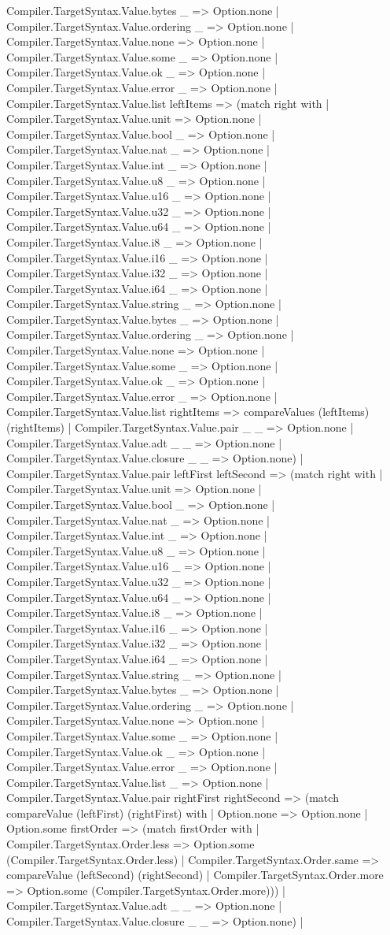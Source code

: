 \documentclass[11pt]{article}
\begin{document}
Compiler.TargetSyntax.Value.bytes \_ => Option.none | Compiler.TargetSyntax.Value.ordering \_ => Option.none | Compiler.TargetSyntax.Value.none => Option.none | Compiler.TargetSyntax.Value.some \_ => Option.none | Compiler.TargetSyntax.Value.ok \_ => Option.none | Compiler.TargetSyntax.Value.error \_ => Option.none | Compiler.TargetSyntax.Value.list leftItems => (match right with | Compiler.TargetSyntax.Value.unit => Option.none | Compiler.TargetSyntax.Value.bool \_ => Option.none | Compiler.TargetSyntax.Value.nat \_ => Option.none | Compiler.TargetSyntax.Value.int \_ => Option.none | Compiler.TargetSyntax.Value.u8 \_ => Option.none | Compiler.TargetSyntax.Value.u16 \_ => Option.none | Compiler.TargetSyntax.Value.u32 \_ => Option.none | Compiler.TargetSyntax.Value.u64 \_ => Option.none | Compiler.TargetSyntax.Value.i8 \_ => Option.none | Compiler.TargetSyntax.Value.i16 \_ => Option.none | Compiler.TargetSyntax.Value.i32 \_ => Option.none | Compiler.TargetSyntax.Value.i64 \_ => Option.none | Compiler.TargetSyntax.Value.string \_ => Option.none | Compiler.TargetSyntax.Value.bytes \_ => Option.none | Compiler.TargetSyntax.Value.ordering \_ => Option.none | Compiler.TargetSyntax.Value.none => Option.none | Compiler.TargetSyntax.Value.some \_ => Option.none | Compiler.TargetSyntax.Value.ok \_ => Option.none | Compiler.TargetSyntax.Value.error \_ => Option.none | Compiler.TargetSyntax.Value.list rightItems => compareValues (leftItems) (rightItems) | Compiler.TargetSyntax.Value.pair \_ \_ => Option.none | Compiler.TargetSyntax.Value.adt \_ \_ => Option.none | Compiler.TargetSyntax.Value.closure \_ \_ => Option.none) | Compiler.TargetSyntax.Value.pair leftFirst leftSecond => (match right with | Compiler.TargetSyntax.Value.unit => Option.none | Compiler.TargetSyntax.Value.bool \_ => Option.none | Compiler.TargetSyntax.Value.nat \_ => Option.none | Compiler.TargetSyntax.Value.int \_ => Option.none | Compiler.TargetSyntax.Value.u8 \_ => Option.none | Compiler.TargetSyntax.Value.u16 \_ => Option.none | Compiler.TargetSyntax.Value.u32 \_ => Option.none | Compiler.TargetSyntax.Value.u64 \_ => Option.none | Compiler.TargetSyntax.Value.i8 \_ => Option.none | Compiler.TargetSyntax.Value.i16 \_ => Option.none | Compiler.TargetSyntax.Value.i32 \_ => Option.none | Compiler.TargetSyntax.Value.i64 \_ => Option.none | Compiler.TargetSyntax.Value.string \_ => Option.none | Compiler.TargetSyntax.Value.bytes \_ => Option.none | Compiler.TargetSyntax.Value.ordering \_ => Option.none | Compiler.TargetSyntax.Value.none => Option.none | Compiler.TargetSyntax.Value.some \_ => Option.none | Compiler.TargetSyntax.Value.ok \_ => Option.none | Compiler.TargetSyntax.Value.error \_ => Option.none | Compiler.TargetSyntax.Value.list \_ => Option.none | Compiler.TargetSyntax.Value.pair rightFirst rightSecond => (match compareValue (leftFirst) (rightFirst) with | Option.none => Option.none | Option.some firstOrder => (match firstOrder with | Compiler.TargetSyntax.Order.less => Option.some (Compiler.TargetSyntax.Order.less) | Compiler.TargetSyntax.Order.same => compareValue (leftSecond) (rightSecond) | Compiler.TargetSyntax.Order.more => Option.some (Compiler.TargetSyntax.Order.more))) | Compiler.TargetSyntax.Value.adt \_ \_ => Option.none | Compiler.TargetSyntax.Value.closure \_ \_ => Option.none) | 
\end{document}
